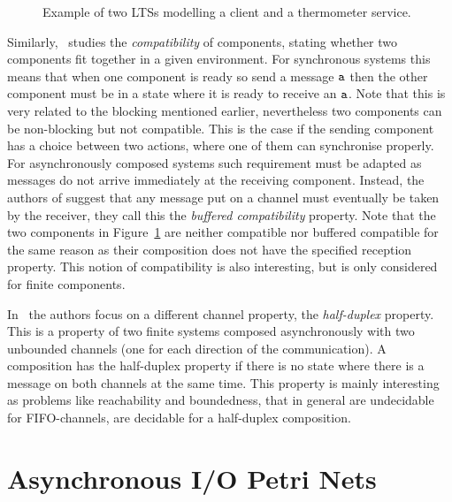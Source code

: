 \begin{figure}[ht]         
\centering
    \caption{Example of two LTSs modelling a client and a thermometer service.}
    \label{fig:intro:brand}
\end{figure} 

Similarly,~\cite{alfaroHenzinger2005} studies the \emph{compatibility} of components, stating whether two components fit together in a given environment. 
For synchronous systems this means that when one component is ready so send a message $\mathtt{a}$ then the other component must be in a state where it is ready to receive an $\mathtt{a}$. Note that this is very related to the blocking mentioned earlier, nevertheless two components can be non-blocking but not compatible. This is the case if the sending component has a choice between two actions, where one of them can synchronise properly. 
For asynchronously composed systems such requirement must be adapted as messages do not arrive immediately at the receiving component. Instead, the authors of \cite{hennicker2010} suggest that any message put on a channel must eventually be taken by the receiver, they call this the \emph{buffered compatibility} property. Note that the two components in Figure~\ref{fig:intro:brand} are neither compatible nor buffered compatible for the same reason as their composition does not have the specified reception property. This notion of compatibility is also interesting, but is only considered for finite components. %

In~\cite{Cece:2005:VPH:1124524.1709549} the authors focus on a different channel property, the \emph{half-duplex} property. This is a property of two finite systems composed asynchronously with two unbounded channels (one for each direction of the communication). A composition has the half-duplex property if there is no state where there is a message on both channels at the same time. This property is mainly interesting as problems like reachability and boundedness, that in general are undecidable for FIFO-channels, are decidable for a half-duplex composition.

\section{Asynchronous I/O Petri Nets}

